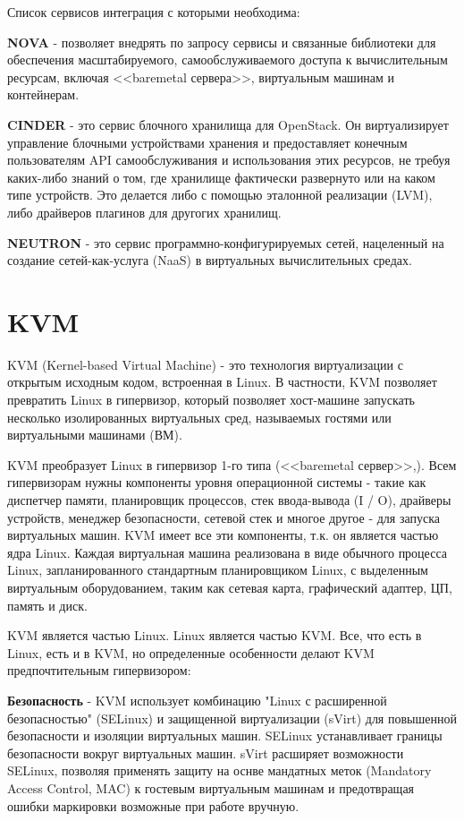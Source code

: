 Список сервисов интеграция с которыми необходима:


\textbf{NOVA} - позволяет внедрять по запросу сервисы и связанные библиотеки для обеспечения масштабируемого, самообслуживаемого доступа к вычислительным ресурсам, включая <<baremetal сервера>>, виртуальным машинам и контейнерам.

\textbf{CINDER} - это сервис блочного хранилища для OpenStack. Он виртуализирует управление блочными устройствами хранения и предоставляет конечным пользователям API самообслуживания и использования этих ресурсов, не требуя каких-либо знаний о том, где хранилище фактически развернуто или на каком типе устройств. Это делается либо с помощью эталонной реализации (LVM), либо драйверов плагинов для другогих хранилищ.

\textbf{NEUTRON} - это сервис программно-конфигурируемых сетей, нацеленный на создание сетей-как-услуга (NaaS) в виртуальных вычислительных средах.

\section{KVM}\label{sec:ch3/sect7}
KVM (Kernel-based Virtual Machine) - это технология виртуализации с открытым исходным кодом, встроенная в Linux. В частности, KVM позволяет превратить Linux в гипервизор, который позволяет хост-машине запускать несколько изолированных виртуальных сред, называемых гостями или виртуальными машинами (ВМ).


KVM преобразует Linux в гипервизор 1-го типа (<<baremetal сервер>>,). Всем гипервизорам нужны компоненты уровня операционной системы - такие как диспетчер памяти, планировщик процессов, стек ввода-вывода (I / O), драйверы устройств, менеджер безопасности, сетевой стек и многое другое - для запуска виртуальных машин. KVM имеет все эти компоненты, т.к. он является частью ядра Linux. Каждая виртуальная машина реализована в виде обычного процесса Linux, запланированного стандартным планировщиком Linux, с выделенным виртуальным оборудованием, таким как сетевая карта, графический адаптер, ЦП, память и диск.


KVM является частью Linux. Linux является частью KVM. Все, что есть в Linux, есть и в KVM, но определенные особенности делают KVM предпочтительным гипервизором:

\textbf{Безопасность} - KVM использует комбинацию "Linux с расширенной безопасностью" (SELinux) и защищенной виртуализации (sVirt) для повышенной безопасности и изоляции виртуальных машин. SELinux устанавливает границы безопасности вокруг виртуальных машин. sVirt расширяет возможности SELinux, позволяя применять защиту на оснве мандатных меток (Mandatory Access Control, MAC) к гостевым виртуальным машинам и предотвращая ошибки маркировки возможные при работе вручную.


